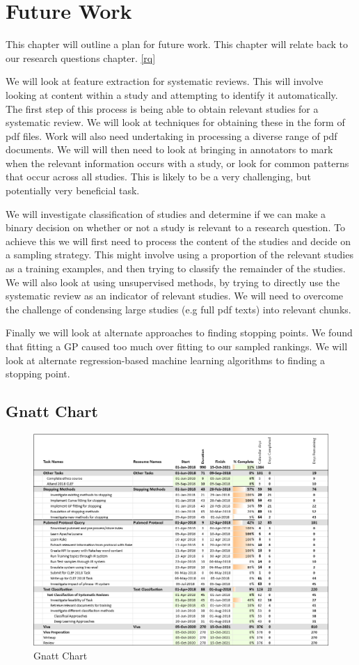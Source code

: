 \chapter{Future Work} \label{fw}

This chapter will outline a plan for future work. This chapter will relate back to our research questions chapter. \ref{rq}

We will look at feature extraction for systematic reviews. This will involve looking at content within a study and attempting to identify it automatically. The first step of this process is being able to obtain relevant studies for a systematic review. We will look at techniques for obtaining these in the form of pdf files. Work will also need undertaking in processing a diverse range of pdf documents. We will will then need to look at bringing in annotators to mark when the relevant information occurs with a study, or look for common patterns that occur across all studies. This is likely to be a very challenging, but potentially very beneficial task.


We will investigate classification of studies and determine if we can make a binary decision on whether or not a study is relevant to a research question. To achieve this we will first need to process the content of the studies and decide on a sampling strategy. This might involve using a proportion of the relevant studies as a training examples, and then trying to classify the remainder of the studies. We will also look at using unsupervised methods, by trying to directly use the systematic review as an indicator of relevant studies. We will need to overcome the challenge of condensing large studies (e.g full pdf texts) into relevant chunks.

Finally we will look at alternate approaches to finding stopping points. We found that fitting a GP caused too much over fitting to our sampled rankings. We will look at alternate regression-based machine learning algorithms to finding a stopping point.


\section{Gnatt Chart}

\begin{figure}[H]
\center
\includegraphics[width=17cm]{figures/gnatt.png}
\caption{Gnatt Chart}
\end{figure}



